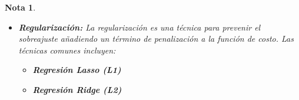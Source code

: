 \documentclass[12pt]{article}
\newtheorem{Note}{Nota}%
\begin{document}
\begin{Note}
\begin{itemize}
\begin{itemize}
\item \textbf{Subajuste:} El subajuste ocurre cuando un modelo no captura los patrones subyacentes de los datos. Los síntomas incluyen baja precisión tanto en el entrenamiento como en la validación.
\end{itemize}

\item \textbf{Regularización:} La regularización es una técnica para prevenir el sobreajuste añadiendo un término de penalización a la función de costo. Las técnicas comunes incluyen:
\begin{itemize}
    \item \textbf{Regresión Lasso (L1)}
    \item \textbf{Regresión Ridge (L2)}
\end{itemize}
\end{itemize}
\end{Note}
\end{document}
